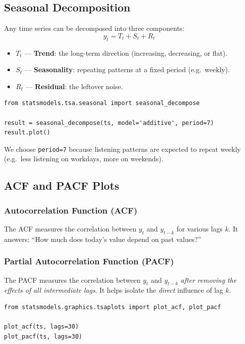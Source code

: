 \documentclass[12pt, a4paper]{article}
\begin{document}
\subsection{Seasonal Decomposition}

Any time series can be decomposed into three components:
\[
    y_t = T_t + S_t + R_t
\]
\begin{itemize}
    \item $T_t$ — \textbf{Trend}: the long-term direction (increasing,
          decreasing, or flat).
    \item $S_t$ — \textbf{Seasonality}: repeating patterns at a fixed period
          (e.g.\ weekly).
    \item $R_t$ — \textbf{Residual}: the leftover noise.
\end{itemize}

\begin{lstlisting}
from statsmodels.tsa.seasonal import seasonal_decompose

result = seasonal_decompose(ts, model='additive', period=7)
result.plot()
\end{lstlisting}

We choose \texttt{period=7} because listening patterns are expected to repeat
weekly (e.g.\ less listening on workdays, more on weekends).

\subsection{ACF and PACF Plots}

\subsubsection{Autocorrelation Function (ACF)}
The ACF measures the correlation between $y_t$ and $y_{t-k}$ for various
lags $k$. It answers: ``How much does today's value depend on past values?''

\subsubsection{Partial Autocorrelation Function (PACF)}
The PACF measures the correlation between $y_t$ and $y_{t-k}$ \emph{after
removing the effects of all intermediate lags}. It helps isolate the
\emph{direct} influence of lag $k$.

\begin{lstlisting}
from statsmodels.graphics.tsaplots import plot_acf, plot_pacf

plot_acf(ts, lags=30)
plot_pacf(ts, lags=30)
\end{lstlisting}
\end{document}
